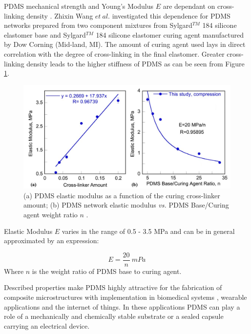 PDMS mechanical strength and Young's Modulus $E$ are dependant on cross-linking density \cite{wang_crosslinking_2014}. Zhixin Wang \textit{$et\ al.$} investigated this dependence for PDMS networks prepared from two component mixtures from Sylgard$^{TM}$ 184 silicone elastomer base and Sylgard$^{TM}$  184 silicone elastomer curing agent manufactured by Dow Corning (Mid-land, MI). The amount of curing agent used lays in direct correlation with the degree of cross-linking in the final elastomer. Greater cross-linking density leads to the higher stiffness of PDMS as can be seen from Figure \ref{fig:PDMS-mechan}. 

\begin{figure}[H]
\centering
\includegraphics[width=1\textwidth]{Figures/Theory/PDMS-elastic-modulus.jpg}
\medskip
\captionsetup{width=1\linewidth}
\caption{(a) PDMS elastic modulus as a function of the curing cross-linker amount; (b) PDMS network elastic modulus \textit{vs.} PDMS Base/Curing agent weight ratio $n$ \cite{wang_crosslinking_2014}.}
\label{fig:PDMS-mechan}
\end{figure}

Elastic Modulus $E$ varies in the range of 0.5 - 3.5 MPa and can be in general approximated by an expression:

\begin{equation}
    E = \frac{20}{n}\ mPa
    \label{eq:young-pdms}
\end{equation}
 Where $n$ is the weight ratio of PDMS base to curing agent. 


Described properties make PDMS highly attractive for the fabrication of composite microstructures with implementation in biomedical systems \cite{mata_characterization_2005}, wearable applications and the internet of things. In these applications PDMS can play a role of a mechanically and chemically stable substrate or a sealed capsule carrying an electrical device.


